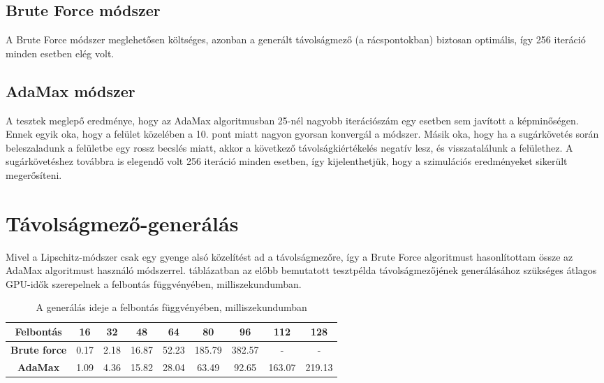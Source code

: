 \subsection{Brute Force módszer}
A Brute Force módszer meglehetősen költséges, azonban a generált távolságmező (a rácspontokban) biztosan optimális, így 256 iteráció minden esetben elég volt.

\subsection{AdaMax módszer}
A tesztek meglepő eredménye, hogy az AdaMax algoritmusban 25-nél nagyobb iterációszám egy esetben sem javított a képminőségen. Ennek egyik oka, hogy a felület közelében a 10. pont miatt nagyon gyorsan konvergál a módszer. Másik oka, hogy ha a sugárkövetés során beleszaladunk a felületbe egy rossz becslés miatt, akkor a következő távolságkiértékelés negatív lesz, és visszatalálunk a felülethez. A sugárkövetéshez továbbra is elegendő volt 256 iteráció minden esetben, így kijelenthetjük, hogy a szimulációs eredményeket sikerült megerősíteni.


\section{Távolságmező-generálás}
Mivel a Lipschitz-módszer csak egy gyenge alsó közelítést ad a távolságmezőre, így a Brute Force algoritmust hasonlítottam össze az AdaMax algoritmust használó  módszerrel.  táblázatban az előbb bemutatott tesztpélda távolságmezőjének generálásához szükséges átlagos GPU-idők szerepelnek a felbontás függvényében, milliszekundumban.

\begin{table}[H]
	\begin{center}
		\begin{tabular}{| c || c | c | c | c | c | c | c | c |}
			\hline
			\textbf{Felbontás} & 16	& 32 & 48 & 64 & 80 & 96 & 112 & 128 \\ 
			\hline\hline
			\textbf{Brute force} & 0.17 & 2.18 & 16.87 & 52.23 & 185.79 & 382.57 & - & - \\
			\hline
			\textbf{AdaMax} & 1.09 & 4.36 & 15.82 & 28.04 & 63.49 & 92.65 & 163.07 & 219.13
			\\
			\hline
		\end{tabular}
	\end{center}
	\caption{A generálás ideje a felbontás függvényében, milliszekundumban}
	\label{tab:gen}
\end{table}

